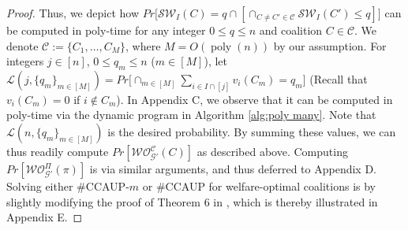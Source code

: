 \documentclass[letterpaper]{article} %
\DeclareMathOperator*{\poly}{poly}
\begin{document}
\begin{proof}

Thus, we depict how $Pr\big[\mathcal{SW}_I(C) = q \cap [\cap_{C \neq C' \in \mathcal{C}} \mathcal{SW}_I(C') \leq q]\big]$ can be computed in poly-time for any integer $0 \leq q \leq n$ and coalition $C \in \mathcal{C}$. We denote $\mathcal{C} := \{C_1, \dots, C_M\}$, where $M = O(\poly(n))$ by our assumption. For integers $j \in [n]$, $0 \leq q_m \leq n$ ($m \in [M]$), let $\mathcal{L}(j,\{q_m\}_{m \in [M]}) = Pr\big[\cap_{m \in [M]} \sum_{i \in I \cap [j]} v_i(C_m) = q_m \big]$ (Recall that $v_i(C_m) = 0$ if $i \notin C_m$). In Appendix C, we observe that it can be computed in poly-time via the dynamic program in Algorithm \ref{alg:poly many}. Note that $\mathcal{L}(n,\{q_m\}_{m \in [M]})$ is the desired probability. By summing these values, we can thus readily compute $Pr[\mathcal{WO}^{\mathcal{C}}_{\mathcal{G}'}(C)]$ as described above. Computing $Pr[\mathcal{WO}_{\mathcal{G}'}^{\Pi}(\pi)]$ is via similar arguments, and thus deferred to Appendix D. Solving either \#CCAUP-$m$ or \#CCAUP for welfare-optimal coalitions is by slightly modifying the proof of Theorem 6 in \cite{wojtas2012possible}, which is thereby illustrated in Appendix E.
\end{proof}
\end{document}
